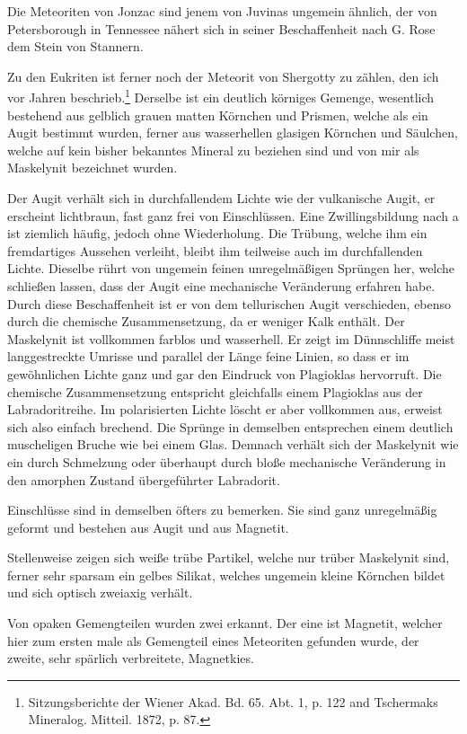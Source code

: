\documentclass[a4paper, 12pt, oneside]{article}
\begin{document}
Die Meteoriten von Jonzac sind jenem von Juvinas ungemein ähnlich, der von Petersborough in Tennessee nähert sich in seiner Beschaffenheit nach G. Rose dem Stein von Stannern.

Zu den Eukriten ist ferner noch der Meteorit von Shergotty zu zählen, den ich vor Jahren beschrieb.\footnote{Sitzungsberichte der Wiener Akad. Bd. 65. Abt. 1, p. 122 and Tschermaks Mineralog. Mitteil. 1872, p. 87.} Derselbe ist ein deutlich körniges Gemenge, wesentlich bestehend aus gelblich grauen matten Körnchen und Prismen, welche als ein Augit bestimmt wurden, ferner aus wasserhellen glasigen Körnchen und Säulchen, welche auf kein bisher bekanntes Mineral zu beziehen sind und von mir als Maskelynit bezeichnet wurden.

Der Augit verhält sich in durchfallendem Lichte wie der vulkanische Augit, er erscheint lichtbraun, fast ganz frei von Einschlüssen. Eine Zwillingsbildung nach a ist ziemlich häufig, jedoch ohne Wiederholung. Die Trübung, welche ihm ein fremdartiges Aussehen verleiht, bleibt ihm teilweise auch im durchfallenden Lichte. Dieselbe rührt von ungemein feinen unregelmäßigen Sprüngen her, welche schließen lassen, dass der Augit eine mechanische Veränderung erfahren habe. Durch diese Beschaffenheit ist er von dem tellurischen Augit verschieden, ebenso durch die chemische Zusammensetzung, da er weniger Kalk enthält. Der Maskelynit ist vollkommen farblos und wasserhell. Er zeigt im Dünnschliffe meist langgestreckte Umrisse und parallel der Länge feine Linien, so dass er im gewöhnlichen Lichte ganz und gar den Eindruck von Plagioklas hervorruft. Die chemische Zusammensetzung entspricht gleichfalls einem Plagioklas aus der Labradoritreihe. Im polarisierten Lichte löscht er aber vollkommen aus, erweist sich also einfach brechend. Die Sprünge in demselben entsprechen einem deutlich muscheligen Bruche wie bei einem Glas. Demnach verhält sich der Maskelynit wie ein durch Schmelzung oder überhaupt durch bloße mechanische Veränderung in den amorphen Zustand übergeführter Labradorit.

Einschlüsse sind in demselben öfters zu bemerken. Sie sind ganz unregelmäßig geformt und bestehen aus Augit und aus Magnetit.

Stellenweise zeigen sich weiße trübe Partikel, welche nur trüber Maskelynit sind, ferner sehr sparsam ein gelbes Silikat, welches ungemein kleine Körnchen bildet und sich optisch zweiaxig verhält.

Von opaken Gemengteilen wurden zwei erkannt. Der eine ist Magnetit, welcher hier zum ersten male als Gemengteil eines Meteoriten gefunden wurde, der zweite, sehr spärlich verbreitete, Magnetkies.
\end{document}
